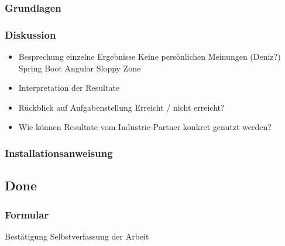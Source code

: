 \documentclass[../main.tex]{subfiles}
\begin{document}
	\subsubsection{Grundlagen}
	
	\subsubsection{Diskussion}
	\begin{itemize}
		\item Besprechung einzelne Ergebnisse
		\subitem Keine persönlichen Meinungen (Deniz?)
		\subitem Spring Boot
		\subitem Angular
		\subitem Sloppy Zone
		
		\item Interpretation der Resultate
		
		\item Rückblick auf Aufgabenstellung
		\subitem Erreicht / nicht erreicht?
		
		\item Wie können Resultate vom Industrie-Partner konkret genutzt werden?
	\end{itemize}
	
	\subsubsection{Installationsanweisung}
	\subsection{Done}

	\subsubsection{Formular}
	Bestätigung Selbstverfassung der Arbeit %


	
\end{document}
